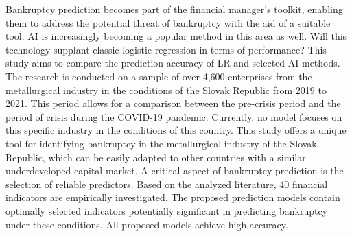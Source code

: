 
\begin{Abstrakt}
    Bankruptcy prediction becomes part of the financial manager's toolkit, enabling them to address the potential threat of bankruptcy with the aid of a suitable tool. AI is increasingly becoming a popular method in this area as well. Will this technology supplant classic logistic regression in terms of performance? This study aims to compare the prediction accuracy of LR and selected AI methods. The research is conducted on a sample of over 4,600 enterprises from the metallurgical industry in the conditions of the Slovak Republic from 2019 to 2021. This period allows for a comparison between the pre-crisis period and the period of crisis during the COVID-19 pandemic. Currently, no model focuses on this specific industry in the conditions of this country. This study offers a unique tool for identifying bankruptcy in the metallurgical industry of the Slovak Republic, which can be easily adapted to other countries with a similar underdeveloped capital market. A critical aspect of bankruptcy prediction is the selection of reliable predictors. Based on the analyzed literature, 40 financial indicators are empirically investigated. The proposed prediction models contain optimally selected indicators potentially significant in predicting bankruptcy under these conditions. All proposed models achieve high accuracy.
\end{Abstrakt}



\clearpage